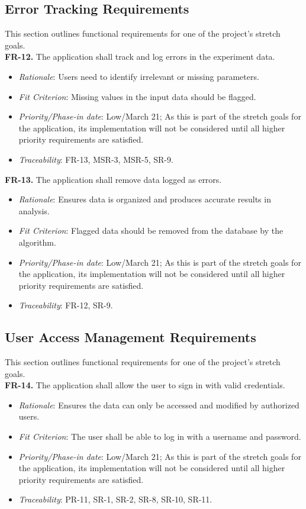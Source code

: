 \documentclass[12pt]{article}
\begin{document}
\subsection{Error Tracking Requirements}
This section outlines functional requirements for one of the project's stretch
goals.\\
\newline
\textbf{FR-12.} The application shall track and log errors in the experiment data.
  \begin{itemize}
    \item \textit{Rationale}: Users need to identify irrelevant or missing parameters.
    \item \textit{Fit Criterion}: Missing values in the input data should be flagged.
    \item \textit{Priority/Phase-in date}: Low/March 21; As this is part of the stretch goals for the application, its implementation will not be considered until all higher priority requirements are satisfied.
    \item \textit{Traceability}: FR-13, MSR-3, MSR-5, SR-9.
  \end{itemize}
\textbf{FR-13.} The application shall remove data logged as errors.
  \begin{itemize}
    \item \textit{Rationale}: Ensures data is organized and produces accurate results in analysis.
    \item \textit{Fit Criterion}: Flagged data should be removed from the database by the algorithm.
    \item \textit{Priority/Phase-in date}: Low/March 21; As this is part of the stretch goals for the application, its implementation will not be considered until all higher priority requirements are satisfied.
    \item \textit{Traceability}: FR-12, SR-9.
  \end{itemize}

\subsection{User Access Management Requirements}
This section outlines functional requirements for one of the project's stretch
goals.\\
\newline
\textbf{FR-14.} The application shall allow the user to sign in with valid credentials.
  \begin{itemize}
    \item \textit{Rationale}: Ensures the data can only be accessed and modified by authorized users.
    \item \textit{Fit Criterion}: The user shall be able to log in with a username and password.
    \item \textit{Priority/Phase-in date}: Low/March 21; As this is part of the stretch goals for the application, its implementation will not be considered until all higher priority requirements are satisfied.
    \item \textit{Traceability}: PR-11, SR-1, SR-2, SR-8, SR-10, SR-11.
  \end{itemize}
\end{document}
